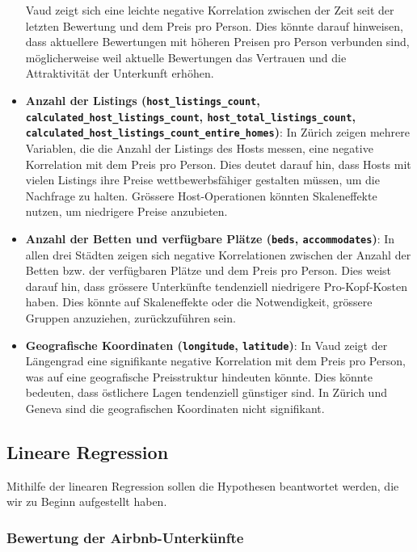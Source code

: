 \documentclass[
  journal,
]{IEEEtran}%
\begin{document}
\begin{itemize}
  Vaud zeigt sich eine leichte negative Korrelation zwischen der Zeit
  seit der letzten Bewertung und dem Preis pro Person. Dies könnte
  darauf hinweisen, dass aktuellere Bewertungen mit höheren Preisen pro
  Person verbunden sind, möglicherweise weil aktuelle Bewertungen das
  Vertrauen und die Attraktivität der Unterkunft erhöhen.
\item
  \textbf{Anzahl der Listings (\texttt{host\_listings\_count},
  \texttt{calculated\_host\_listings\_count},
  \texttt{host\_total\_listings\_count},
  \texttt{calculated\_host\_listings\_count\_entire\_homes})}: In Zürich
  zeigen mehrere Variablen, die die Anzahl der Listings des Hosts
  messen, eine negative Korrelation mit dem Preis pro Person. Dies
  deutet darauf hin, dass Hosts mit vielen Listings ihre Preise
  wettbewerbsfähiger gestalten müssen, um die Nachfrage zu halten.
  Grössere Host-Operationen könnten Skaleneffekte nutzen, um niedrigere
  Preise anzubieten.
\item
  \textbf{Anzahl der Betten und verfügbare Plätze (\texttt{beds},
  \texttt{accommodates})}: In allen drei Städten zeigen sich negative
  Korrelationen zwischen der Anzahl der Betten bzw. der verfügbaren
  Plätze und dem Preis pro Person. Dies weist darauf hin, dass grössere
  Unterkünfte tendenziell niedrigere Pro-Kopf-Kosten haben. Dies könnte
  auf Skaleneffekte oder die Notwendigkeit, grössere Gruppen anzuziehen,
  zurückzuführen sein.
\item
  \textbf{Geografische Koordinaten (\texttt{longitude},
  \texttt{latitude})}: In Vaud zeigt der Längengrad eine signifikante
  negative Korrelation mit dem Preis pro Person, was auf eine
  geografische Preisstruktur hindeuten könnte. Dies könnte bedeuten,
  dass östlichere Lagen tendenziell günstiger sind. In Zürich und Geneva
  sind die geografischen Koordinaten nicht signifikant.
\end{itemize}

\hypertarget{lineare-regression-1}{%
\subsection{\texorpdfstring{\textbf{Lineare
Regression}}{Lineare Regression}}\label{lineare-regression-1}}

Mithilfe der linearen Regression sollen die Hypothesen beantwortet
werden, die wir zu Beginn aufgestellt haben.

\hypertarget{bewertung-der-airbnb-unterkuxfcnfte}{%
\subsubsection{Bewertung der
Airbnb-Unterkünfte}\label{bewertung-der-airbnb-unterkuxfcnfte}}
\end{document}
